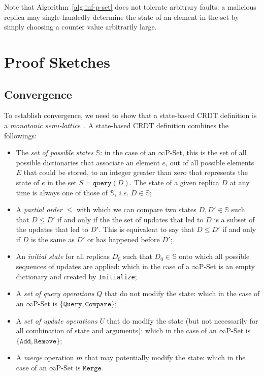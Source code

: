 \documentclass[10pt, oneside]{article}   	%
\begin{document}
Note that Algorithm~\ref{alg:inf-p-set} does not tolerate arbitrary faults: a malicious replica may single-handedly determine the state of an element in the set by simply choosing a counter value arbitrarily large.

\section{Proof Sketches}
\label{sec:proofs}

\subsection{Convergence}
\label{sec:proofs:convergence}

To establish convergence, we need to show that a state-based CRDT definition is a \textit{monotonic semi-lattice}~\cite{shapiro:hal-00932836}. A state-based CRDT definition combines the followings:
\begin{itemize}
	\item The \textit{set of possible states} $\mathds{S}$: in the case of an $\infty$P-Set, this is the set of all possible dictionaries that associate an element $e$, out of all possible elements $E$ that could be stored, to an integer greater than zero that represents the state of $e$ in the set $S = \texttt{query}(D)$. The state of a given replica $D$ at any time is always one of those of $\mathds{S}$, \textit{i.e.} $D \in \mathds{S}$;
	\item A \textit{partial order} $\leq$ with which we can compare two states $D, D' \in \mathds{S}$ such that $D \leq D'$ if and only if the the set of updates that led to $D$ is a subset of the updates that led to $D'$. This is equivalent to say that $D \leq D'$ if and only if $D$ is the same as $D'$ or has happened before $D'$;
	\item An \textit{initial state} for all replicas $D_0$ such that $D_0 \in \mathds{S}$ onto which all possible sequences of updates are applied: which in the case of a $\infty$P-Set is an empty dictionary and created by \texttt{Initialize};
	\item A \textit{set of query operations} $Q$ that do not modify the state: which in the case of an $\infty$P-Set is $\{ \texttt{Query}, \texttt{Compare} \}$;
	\item A \textit{set of update operations} $U$ that do modify the state (but not necessarily for all combination of state and arguments): which in the case of an $\infty$P-Set is $\{ \texttt{Add}, \texttt{Remove} \}$;
	\item A \textit{merge} operation $m$ that may potentially modify the state: which in the case of an $\infty$P-Set is ${ \texttt{Merge} }$.
\end{itemize}
\end{document}
